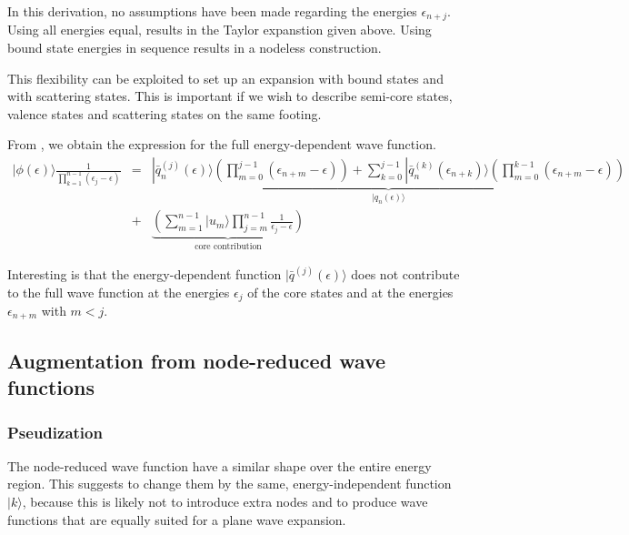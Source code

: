 \documentclass[11pt,a4paper]{report}
\begin{document}
In this derivation, no assumptions have been made regarding the
energies $\epsilon_{n+j}$. Using all energies equal, results in the
Taylor expanstion given above. Using bound state energies in sequence
results in a nodeless construction.

This flexibility can be exploited to set up an expansion with bound
states and with scattering states. This is important if we wish to
describe semi-core states, valence states and scattering states on the
same footing.

From , we obtain the expression for the
full energy-dependent wave function.
\begin{eqnarray}
|\phi(\epsilon)\rangle
\frac{1}{\prod_{k=1}^{n-1}(\epsilon_j-\epsilon)}
&=&
\underbrace{
|\bar{q}_n^{(j)}(\epsilon)\rangle
\left(\prod_{m=0}^{j-1}(\epsilon_{n+m}-\epsilon)\right)
+
\sum_{k=0}^{j-1}
|\bar{q}_{n}^{(k)}(\epsilon_{n+k})\rangle
\left(\prod_{m=0}^{k-1}(\epsilon_{n+m}-\epsilon)\right)
}_{|q_n(\epsilon)\rangle}
\nonumber\\
&+&
\underbrace{
\left(\sum_{m=1}^{n-1}|u_m\rangle\prod_{j=m}^{n-1}\frac{1}{\epsilon_j-\epsilon}\right)
}_{\text{core contribution}}
\end{eqnarray}

Interesting is that the energy-dependent function
$|\bar{q}^{(j)}(\epsilon)\rangle$ does not contribute to the full wave
function at the energies $\epsilon_{j}$ of the core states and at the
energies $\epsilon_{n+m}$ with $m<j$.



\subsection{Augmentation from node-reduced wave functions}
\subsubsection{Pseudization}

The node-reduced wave function have a similar shape over the entire
energy region. This suggests to change them by the same,
energy-independent function $|k\rangle$, because this is likely not to
introduce extra nodes and to produce wave functions that are equally
suited for a plane wave expansion.
\end{document}
